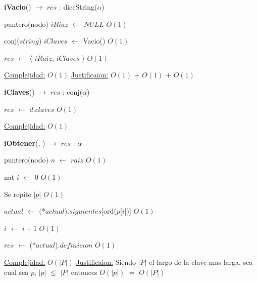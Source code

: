 \begin{Algoritmos}
  
  
\begin{algorithm}[H]
{\textbf{iVacio}() $\to$ $res$ : diccString($\alpha$)}
\begin{algorithmic}[1]

\State puntero(nodo) $iRiaz$ $\gets $ $NULL$  \Comment $O(1)$
 
\State conj($string$) $iClaves$ $\gets$ Vacio() \Comment $O(1)$

\State $res$ $\gets$  $\langle$ $iRaiz$, $iClaves$ $\rangle$ \Comment $O(1)$

\medskip
\State \underline{Complejidad:} $O(1)$
\State \underline{Justificaion:} $O(1)$ $+$ $O(1)$ $+$ $O(1)$

\end{algorithmic}
\end{algorithm}  

\begin{algorithm}[H]
{\textbf{iClaves}(}) $\to$ $res$ : conj($\alpha$)
\begin{algorithmic}[1]

\State $res$ $\gets$ $d$.$claves$ \Comment $O(1)$

\medskip
\State \underline{Complejidad:} $O(1)$

\end{algorithmic}
\end{algorithm}
  
  
  
\begin{algorithm}[H]
{\textbf{iObtener}(, }) $\to$ $res$ : $\alpha$
\begin{algorithmic}[1]

\State puntero(nodo) $n$ $\gets$ $raiz$ \Comment $O(1)$

\State nat $i$ $\gets$ $0$ \Comment $O(1)$


   \Comment Se repite $|p|$ $O(1)$
		

	\State $actual$ $\gets$ (*$actual$).$siguientes$[ord($p$[$i$])] \Comment $O(1)$

	\State $i$ $\gets$ $i + 1$ \Comment $O(1)$
\EndWhile 


\State $res$ $\gets$ (*$actual$).$definicion$ \Comment $O(1)$ 

\medskip
\State \underline{Complejidad:} $O(|P|)$
\State \underline{Justificaion:} Siendo $|P|$ el largo de la clave mas larga, sea cual sea $p$, $|p|$ $\leq$ $|P|$ entonces 	$O(|p|)$ $=$ $O(|P|)$


\end{algorithmic}
\end{algorithm}
\end{Algoritmos}

